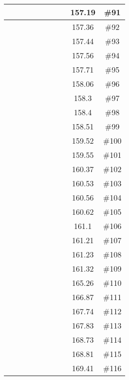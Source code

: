 \begin{center}
\begin{longtable}{|c|c|c|c|c|c|c|c|c|c|}
 \x &  &  \x &  &  &  \x &  \x &  & 157.19 & \#91 \\ \hline
 \x &  &  &  &  &  &  \x &  \x & 157.36 & \#92 \\ \hline
 \x &  &  \x &  \x &  \x &  &  &  \x & 157.44 & \#93 \\ \hline
 \x &  \x &  &  &  \x &  &  \x &  \x & 157.56 & \#94 \\ \hline
 \x &  \x &  \x &  &  &  &  \x &  & 157.71 & \#95 \\ \hline
 \x &  &  &  \x &  \x &  &  \x &  & 158.06 & \#96 \\ \hline
 \x &  \x &  &  \x &  &  &  &  & 158.3 & \#97 \\ \hline
 \x &  &  &  \x &  &  &  \x &  \x & 158.4 & \#98 \\ \hline
 \x &  &  &  &  &  \x &  \x &  & 158.51 & \#99 \\ \hline
 \x &  \x &  \x &  \x &  \x &  &  \x &  \x & 159.52 & \#100 \\ \hline
 \x &  &  \x &  \x &  &  &  \x &  & 159.55 & \#101 \\ \hline
 \x &  &  \x &  \x &  \x &  &  \x &  \x & 160.37 & \#102 \\ \hline
 \x &  \x &  &  \x &  \x &  \x &  &  \x & 160.53 & \#103 \\ \hline
 \x &  &  &  &  \x &  \x &  \x &  \x & 160.56 & \#104 \\ \hline
 \x &  \x &  \x &  \x &  \x &  \x &  \x &  & 160.62 & \#105 \\ \hline
 \x &  &  \x &  \x &  \x &  \x &  \x &  & 161.1 & \#106 \\ \hline
 \x &  &  &  \x &  \x &  &  &  & 161.21 & \#107 \\ \hline
 \x &  &  \x &  &  \x &  \x &  \x &  \x & 161.23 & \#108 \\ \hline
 \x &  &  \x &  &  \x &  &  \x &  & 161.32 & \#109 \\ \hline
 \x &  &  &  \x &  \x &  &  \x &  \x & 165.26 & \#110 \\ \hline
 \x &  &  &  \x &  \x &  \x &  \x &  & 166.87 & \#111 \\ \hline
 \x &  &  &  \x &  &  \x &  \x &  & 167.74 & \#112 \\ \hline
 \x &  &  &  \x &  &  &  \x &  & 167.83 & \#113 \\ \hline
 \x &  \x &  &  \x &  \x &  \x &  \x &  & 168.73 & \#114 \\ \hline
 \x &  \x &  &  \x &  \x &  &  \x &  & 168.81 & \#115 \\ \hline
 \x &  \x &  \x &  &  \x &  \x &  \x &  \x & 169.41 & \#116 \\ \hline

\end{longtable}
\end{center}
